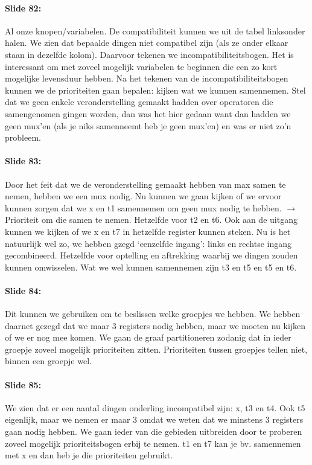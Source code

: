 \documentclass[10pt,a4paper]{book}
\begin{document}
\paragraph{Slide 82:} Al onze knopen/variabelen. De compatibiliteit kunnen we uit de tabel linksonder halen. We zien dat bepaalde dingen niet compatibel zijn (als ze onder elkaar staan in dezelfde kolom). Daarvoor tekenen we incompatibiliteitsbogen. Het is interessant om met zoveel mogelijk variabelen te beginnen die een zo kort mogelijke levensduur hebben. Na het tekenen van de incompatibiliteitsbogen kunnen we de prioriteiten gaan bepalen: kijken wat we kunnen samennemen. Stel dat we geen enkele veronderstelling gemaakt hadden over operatoren die samengenomen gingen worden, dan was het hier gedaan want dan hadden we geen mux'en (als je niks samenneemt heb je geen mux'en) en was er niet zo'n probleem. 

\paragraph{Slide 83:} Door het feit dat we de veronderstelling gemaakt hebben van max samen te nemen, hebben we een mux nodig. Nu kunnen we gaan kijken of we ervoor kunnen zorgen dat we x en t1 samennemen om geen mux nodig te hebben. $\rightarrow$ Prioriteit om die samen te nemen. Hetzelfde voor t2 en t6. Ook aan de uitgang kunnen we kijken of we x en t7 in hetzelfde register kunnen steken.
Nu is het natuurlijk wel zo, we hebben gzegd `eenzelfde ingang': links en rechtse ingang gecombineerd. Hetzelfde voor optelling en aftrekking waarbij we dingen zouden kunnen omwisselen. Wat we wel kunnen samennemen zijn t3 en t5 en t5 en t6.

\paragraph{Slide 84:} Dit kunnen we gebruiken om te beslissen welke groepjes we hebben. We hebben daarnet gezegd dat we maar 3 registers nodig hebben, maar we moeten nu kijken of we er nog mee komen. We gaan de graaf partitioneren zodanig dat in ieder groepje zoveel mogelijk prioriteiten zitten. Prioriteiten tussen groepjes tellen niet, binnen een groepje wel.

\paragraph{Slide 85:} We zien dat er een aantal dingen onderling incompatibel zijn: x, t3 en t4. Ook t5 eigenlijk, maar we nemen er maar 3 omdat we weten dat we minstens 3 registers gaan nodig hebben.
We gaan ieder van die gebieden uitbreiden door te proberen zoveel mogelijk prioriteitsbogen erbij te nemen. t1 en t7 kan je bv. samennemen met x en dan heb je die prioriteiten gebruikt. 
\end{document}
